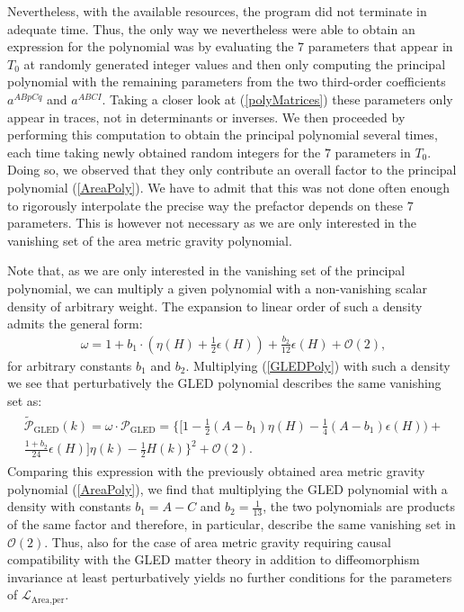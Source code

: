 Nevertheless, with the available resources, the program did not terminate in adequate time. Thus, the only way we nevertheless were able to obtain an expression for the polynomial was by evaluating the $7$ parameters that appear in $T_0$ at randomly generated integer values and then only computing the principal polynomial with the remaining parameters from the two third-order coefficients $a^{ABpCq}$ and $a^{ABCI}$. Taking a closer look at (\ref{polyMatrices}) these parameters only appear in traces, not in determinants or inverses. We then proceeded by performing this computation to obtain the principal polynomial several times, each time taking newly obtained random integers for the $7$ parameters in $T_0$. Doing so, we observed that they only contribute an overall factor to the principal polynomial (\ref{AreaPoly}). We have to admit that this was not done often enough to rigorously interpolate the precise way the prefactor depends on these $7$ parameters. This is however not necessary as we are only interested in the vanishing set of the area metric gravity polynomial. 

Note that, as we are only interested in the vanishing set of the principal polynomial, we can multiply a given polynomial with a non-vanishing scalar density of arbitrary weight. The expansion to linear order of such a density admits the general form:
\begin{align}\label{dens}
\omega = 1+ b_1 \cdot (\eta(H) + \frac{1}{2} \epsilon(H)) + \frac{b_2}{12}\epsilon(H) + \mathcal{O}(2),
\end{align}
for arbitrary constants $b_1$ and $b_2$.
Multiplying  (\ref{GLEDPoly}) with such a density we see that perturbatively the GLED polynomial describes the same vanishing set as:
\begin{align} \label{GLEDPoly2}
\begin{aligned}
    \widetilde{\mathcal{P}}_{\text{GLED}}(k) = \omega \cdot \mathcal{P}_{\text{GLED}} = 
    \bigl\{  \bigl[ 1 - \frac{1}{2} (A-b_1) \eta(H) - \frac{1}{4} (A-b_1) \epsilon(H)) + \\ \frac{1+b_2}{24} \epsilon(H) \bigr] \eta(k)
    -\frac{1}{2} H(k)       \bigr\}^2 + \mathcal{O}(2).
\end{aligned}
\end{align}
Comparing this expression with the previously obtained area metric gravity polynomial (\ref{AreaPoly}), we find that multiplying the GLED polynomial with a density with constants $b_1 = A -C$ and $b_2 = \frac{1}{13}$, the two polynomials are products of the same factor and therefore, in particular, describe the same vanishing set in $\mathcal{O}(2)$. Thus, also for the case of area metric gravity requiring causal compatibility with the GLED matter theory in addition to diffeomorphism invariance at least perturbatively yields no further conditions for the parameters of $\mathcal{L}_{\text{Area,per}}$.


